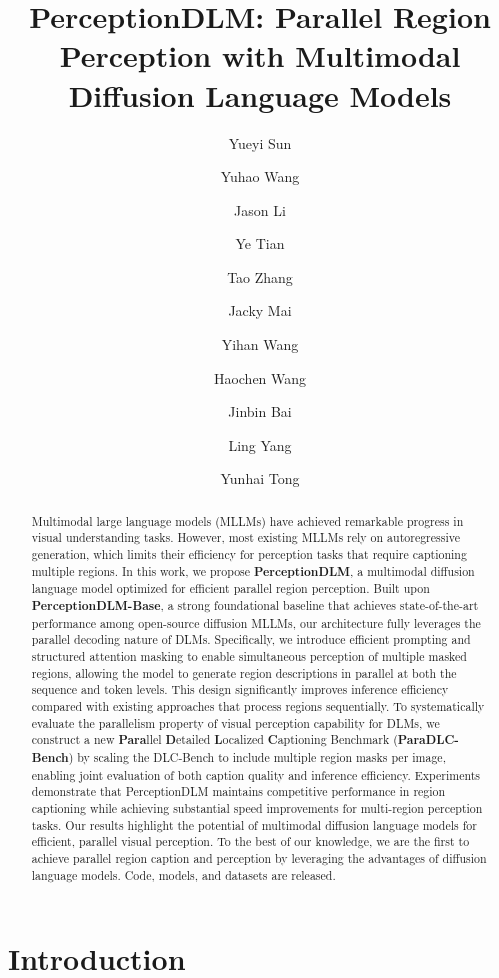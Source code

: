 \documentclass{llmxive}
\title{PerceptionDLM: Parallel Region Perception with Multimodal Diffusion Language Models}
\author{Yueyi Sun \and Yuhao Wang \and Jason Li \and Ye Tian \and Tao Zhang \and Jacky Mai \and Yihan Wang \and Haochen Wang \and Jinbin Bai \and Ling Yang \and Yunhai Tong}
\begin{document}
\maketitle
\begin{abstract}
Multimodal large language models (MLLMs) have achieved remarkable progress in visual understanding tasks. 
However, most existing MLLMs rely on autoregressive generation, which limits their efficiency for perception tasks that require captioning multiple regions. 
In this work, we propose \textbf{PerceptionDLM}, a multimodal diffusion language model optimized for efficient parallel region perception. Built upon \textbf{PerceptionDLM-Base}, a strong foundational baseline that achieves state-of-the-art performance among open-source diffusion MLLMs, our architecture fully leverages the parallel decoding nature of DLMs. Specifically, we introduce efficient prompting and structured attention masking to enable simultaneous perception of multiple masked regions, allowing the model to generate region descriptions in parallel at both the sequence and token levels.
This design significantly improves inference efficiency compared with existing approaches that process regions sequentially.
To systematically evaluate the parallelism property of visual perception capability for DLMs, we construct a new \textbf{Para}llel \textbf{D}etailed \textbf{L}ocalized \textbf{C}aptioning Benchmark (\textbf{ParaDLC-Bench}) by scaling the DLC-Bench to include multiple region masks per image, enabling joint evaluation of both caption quality and inference efficiency. 
Experiments demonstrate that PerceptionDLM maintains competitive performance in region captioning while achieving substantial speed improvements for multi-region perception tasks. 
Our results highlight the potential of multimodal diffusion language models for efficient, parallel visual perception.
To the best of our knowledge, we are the first to achieve parallel region caption and perception by leveraging the advantages of diffusion language models.
Code, models, and datasets are released.
\end{abstract}
\section{Introduction}
\label{sec:intro}
\end{document}
